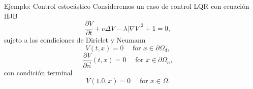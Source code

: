 \documentclass[aspectratio=169,xcolor=dvipsnames]{beamer}
\newcommand{\dpartial}[2]{\frac{\partial #1}{\partial #2}}
\begin{document}
\begin{frame}{Ejemplo: Control estocástico}
	Consideremos un caso de control LQR con ecuación HJB
	\begin{equation}
		\label{eqn:HJB2D}
		\dpartial{V}{t}+\nu \Delta V -\lambda |\nabla V|^2+1=0,
	\end{equation} 
	sujeto a las condiciones de Diriclet y Neumann
	\begin{equation}
		V(t,x)=0 \quad \text{ for } x\in \partial\Omega_d, 
	\end{equation}
	\begin{equation}
		\dpartial{V}{\vec{n}}(t,x)=0 \quad \text{ for } x\in \partial\Omega_n, 
	\end{equation}
	con condición terminal
	\begin{equation}
		V(1.0,x)=0 \quad \text{ for } x\in \Omega.
	\end{equation}
\end{frame}
\end{document}
